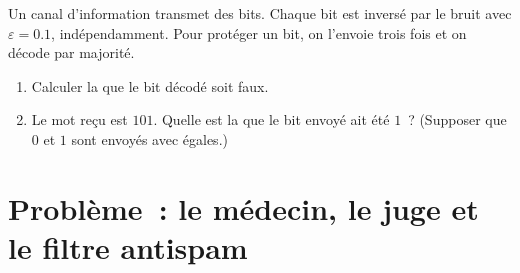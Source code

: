 \begin{exercise}[$\star\star\star$]\label{exo:g12:condprob:8}
Un canal d'information transmet des bits. Chaque bit est inversé par le
bruit avec  $\varepsilon = 0.1$, indépendamment. Pour protéger un
bit, on l'envoie trois fois et on décode par majorité.
\begin{enumerate}
  \item Calculer la  que le bit décodé soit faux.
  \item Le mot reçu est $101$. Quelle est la  que le bit envoyé
        ait été $1$~? (Supposer que $0$ et $1$ sont envoyés avec
         égales.)
\end{enumerate}
\end{exercise}

\section{Problème~: le médecin, le juge et le filtre antispam}

